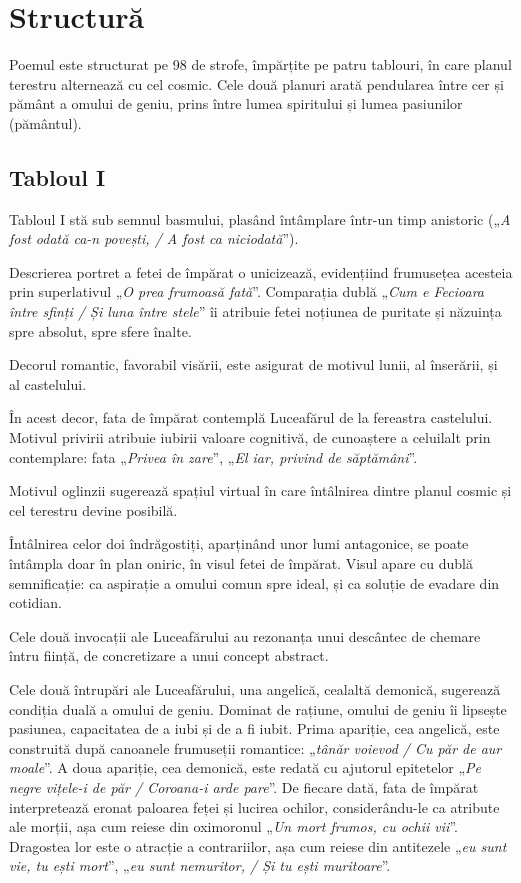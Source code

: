 \documentclass{article}
\newcommand{\qu}[1]{„\emph{#1}”}
\begin{document}
\section{Structură}
Poemul este structurat pe 98 de strofe, împărțite pe patru tablouri, în care planul terestru alternează cu cel cosmic. Cele două planuri arată pendularea între cer și pământ a omului de geniu, prins între lumea spiritului și lumea pasiunilor (pământul).

\subsection{Tabloul I}
Tabloul I stă sub semnul basmului, plasând întâmplare într-un timp anistoric (\qu{A fost odată ca-n povești, / A fost ca niciodată}).

Descrierea portret a fetei de împărat o unicizează, evidențiind frumusețea acesteia prin superlativul \qu{O prea frumoasă fată}. Comparația dublă \qu{Cum e Fecioara între sfinți / Și luna între stele} îi atribuie fetei noțiunea de puritate și năzuința spre absolut, spre sfere înalte.

Decorul romantic, favorabil visării, este asigurat de motivul lunii, al înserării, și al castelului.

În acest decor, fata de împărat contemplă Luceafărul de la fereastra castelului. Motivul privirii atribuie iubirii valoare cognitivă, de cunoaștere a celuilalt prin contemplare: fata \qu{Privea în zare}, \qu{El iar, privind de săptămâni}.

Motivul oglinzii sugerează spațiul virtual în care întâlnirea dintre planul cosmic și cel terestru devine posibilă.

Întâlnirea celor doi îndrăgostiți, aparținând unor lumi antagonice, se poate întâmpla doar în plan oniric, în visul fetei de împărat. Visul apare cu dublă semnificație: ca aspirație a omului comun spre ideal, și ca soluție de evadare din cotidian.

Cele două invocații ale Luceafărului au rezonanța unui descântec de chemare întru ființă, de concretizare a unui concept abstract.

Cele două întrupări ale Luceafărului, una angelică, cealaltă demonică, sugerează condiția duală a omului de geniu. Dominat de rațiune, omului de geniu îi lipsește pasiunea, capacitatea de a iubi și de a fi iubit. Prima apariție, cea angelică, este construită după canoanele frumuseții romantice: \qu{tânăr voievod / Cu păr de aur moale}. A doua apariție, cea demonică, este redată cu ajutorul epitetelor \qu{Pe negre vițele-i de păr / Coroana-i arde pare}. De fiecare dată, fata de împărat interpretează eronat paloarea feței și lucirea ochilor, considerându-le ca atribute ale morții, așa cum reiese din oximoronul \qu{Un mort frumos, cu ochii vii}. Dragostea lor este o atracție a contrariilor, așa cum reiese din antitezele \qu{eu sunt vie, tu ești mort}, \qu{eu sunt nemuritor, / Și tu ești muritoare}.
\end{document}
